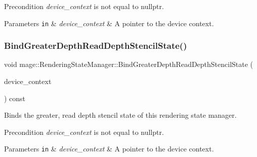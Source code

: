 \begin{DoxyPrecond}{Precondition}
{\itshape device\+\_\+context} is not equal to {\ttfamily nullptr}. 
\end{DoxyPrecond}

\begin{DoxyParams}[1]{Parameters}
\mbox{\tt in}  & {\em device\+\_\+context} & A pointer to the device context. \\
\hline
\end{DoxyParams}
\hypertarget{classmage_1_1_rendering_state_manager_ab30d4cf090cb2f340da158a79014917c}{}\label{classmage_1_1_rendering_state_manager_ab30d4cf090cb2f340da158a79014917c} 
\subsubsection{\texorpdfstring{Bind\+Greater\+Depth\+Read\+Depth\+Stencil\+State()}{BindGreaterDepthReadDepthStencilState()}}
{\footnotesize\ttfamily void mage\+::\+Rendering\+State\+Manager\+::\+Bind\+Greater\+Depth\+Read\+Depth\+Stencil\+State (\begin{DoxyParamCaption}\item[{I\+D3\+D11\+Device\+Context2 $\ast$}]{device\+\_\+context }\end{DoxyParamCaption}) const\hspace{0.3cm}{\ttfamily [noexcept]}}

Binds the greater, read depth stencil state of this rendering state manager.

\begin{DoxyPrecond}{Precondition}
{\itshape device\+\_\+context} is not equal to {\ttfamily nullptr}. 
\end{DoxyPrecond}

\begin{DoxyParams}[1]{Parameters}
\mbox{\tt in}  & {\em device\+\_\+context} & A pointer to the device context. \\
\hline
\end{DoxyParams}
\hypertarget{classmage_1_1_rendering_state_manager_a1e5f40047e76df1fdeb81e60f17a69f4}{}\label{classmage_1_1_rendering_state_manager_a1e5f40047e76df1fdeb81e60f17a69f4} 
